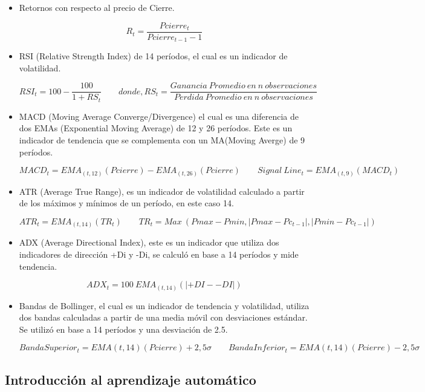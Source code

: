 \documentclass[a4paper,12pt]{Latex/Classes/PhDthesisPSnPDF}
\begin{document}
\begin{itemize}
\item Retornos con respecto al precio de Cierre.

$$ R_{t} = \frac{Pcierre_{t}}{Pcierre_{t-1}-1}$$

\item RSI (Relative Strength Index) de 14 períodos, el cual es un indicador de volatilidad.

$$ RSI_{t} = 100 - \frac{100}{1 + RS_{t}} \qquad 
donde, RS_{t} = \frac{Ganancia\ Promedio\ en\ n\ observaciones}{Perdida\ Promedio\ en\ n\ observaciones}$$

\item MACD (Moving Average Converge/Divergence) el cual es una diferencia de dos EMAs (Exponential Moving Average) de 12 y 26 períodos. Este es un indicador de tendencia que se complementa con un MA(Moving Averge) de 9 períodos. 

$$ MACD_{t} =  EMA_{(t, 12)}(Pcierre) - EMA_{(t, 26)}(Pcierre) \qquad
Signal\ Line_{t} = EMA_{(t, 9)}(MACD_{t}) $$

\item ATR (Average True Range), es un indicador de volatilidad calculado a partir de los máximos y mínimos de un período, en este caso 14.

$$ ATR_{t} =  EMA_{(t, 14)}(TR_{t}) \qquad
TR_{t} = Max\ (Pmax - Pmin, |Pmax - Pc_{t-1}|, |Pmin - Pc_{t-1}|)$$

\item ADX (Average Directional Index), este es un indicador que utiliza dos indicadores de dirección +Di y -Di, se calculó en base a 14 períodos y mide tendencia.

$$ ADX_{t} =  100\ EMA_{(t, 14)}(|+DI - -DI|)$$

\item Bandas de Bollinger, el cual es un indicador de tendencia y volatilidad, utiliza dos bandas calculadas a partir de una media móvil con desviaciones estándar. Se utilizó en base a 14 períodos y una desviación de 2.5.

$$ Banda Superior_{t} = EMA{(t, 14)}(Pcierre) + 2,5\sigma \qquad 
Banda Inferior_{t} = EMA{(t, 14)}(Pcierre) - 2,5\sigma $$

\end{itemize}

\subsection{Introducción al aprendizaje automático}
\end{document}
